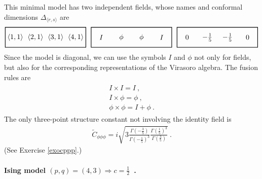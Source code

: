 \documentclass[12pt,a4paper,notitlepage]{report}
\numberwithin{equation}{section}
\theoremstyle{break}
\begin{document}
This minimal model has two independent fields, whose names and conformal dimensions $\Delta_{\langle r,s\rangle}$ are 
\begin{align}
 \begin{tikzpicture}[scale = .5, baseline=(current  bounding  box.center)]
  \draw[thick] (-1,-1) -- (-1, 1) -- (7, 1) -- (7, -1) -- cycle;
  \foreach \x in {1, ..., 4}{
  \node at ({2*(\x-1)}, 0) {$\langle \x,1\rangle $};
  }
 \end{tikzpicture}
 \ \ 
 \begin{tikzpicture}[scale = .5, baseline=(current  bounding  box.center)]
  \draw[thick] (-1,-1) -- (-1, 1) -- (7, 1) -- (7, -1) -- cycle;
  \node at (0, 0) {$I$};
  \node at (2, 0) {$\phi$};
  \node at (4, 0) {$\phi$};
  \node at (6, 0) {$I$};
  \end{tikzpicture}
  \ \ 
  \begin{tikzpicture}[scale = .5, baseline=(current  bounding  box.center)]
  \draw[thick] (-1,-1) -- (-1, 1) -- (7, 1) -- (7, -1) -- cycle;
  \node at (0, 0) {$0$};
  \node at (2, 0) {$-\frac15$};
  \node at (4, 0) {$-\frac15$};
  \node at (6, 0) {$0$};
  \end{tikzpicture}
\end{align}
Since the model is diagonal, we can use the symbols $I$ and $\phi$ not only for fields, but also for the corresponding representations of the Virasoro algebra.
The fusion rules are 
\begin{align}
 \begin{array}{l}
  I\times I = I \ ,
\\ I\times \phi= \phi\ ,
\\ \phi \times \phi = I + \phi\ .
 \end{array}
\end{align}
The only three-point structure constant not involving the identity field is 
\begin{align}
 \tilde{C}_{\phi\phi\phi} = i\sqrt{3\frac{\Gamma(-\frac35)}{\Gamma(-\frac15)^3} \frac{\Gamma(\frac15)^3}{\Gamma(\frac35)}}\ .
\label{cppp}
\end{align}
(See Exercise \ref{exocppp}.)

\paragraph{\textbf{\boldmath Ising model} $(p,q)=(4,3) \Rightarrow c=\tfrac12$\ .}
\end{document}
